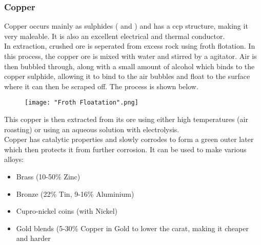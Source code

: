 \documentclass[a4paper, 12pt]{article}
\begin{document}
			\subsubsection*{Copper}
				Copper occurs mainly as sulphides ( and ) and has a ccp structure, making it very maleable. It is also an excellent electrical and thermal conductor. \\
				In extraction, crushed ore is seperated from excess rock using froth flotation. In this process, the copper ore is mixed with water and stirred by a agitator. Air is then bubbled through, along with a small amount of alcohol which binds to the copper sulphide, allowing it to bind to the air bubbles and float to the surface where it can then be scraped off. The process is shown below.
				\begin{figure}[!h]
					\texttt{[image: "Froth Floatation".png]}
				\end{figure}
				
				This copper is then extracted from its ore using either high temperatures (air roasting) or using an aqueous solution with electrolysis.\\
				Copper has catalytic properties and slowly corrodes to form a green outer later which then protects it from further corrosion. It can be used to make various alloys:
				\begin{itemize}
					\item Brass (10-50\% Zinc)
					\item Bronze (22\% Tin, 9-16\% Aluminium)
					\item Cupro-nickel coins (with Nickel)
					\item Gold blends (5-30\% Copper in Gold to lower the carat, making it cheaper and harder
				\end{itemize}
				
\end{document}
